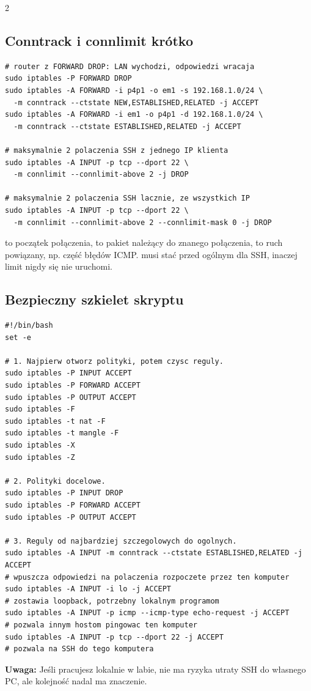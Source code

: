 \documentclass[9pt,a4paper,landscape]{article}
\newcommand{\code}[1]{\texttt{\detokenize{#1}}}
\newcommand{\warn}[1]{\textbf{Uwaga:} #1}
\begin{document}
\begin{multicols*}{2}
\subsection{Conntrack i connlimit krótko}
\begin{lstlisting}
# router z FORWARD DROP: LAN wychodzi, odpowiedzi wracaja
sudo iptables -P FORWARD DROP
sudo iptables -A FORWARD -i p4p1 -o em1 -s 192.168.1.0/24 \
  -m conntrack --ctstate NEW,ESTABLISHED,RELATED -j ACCEPT
sudo iptables -A FORWARD -i em1 -o p4p1 -d 192.168.1.0/24 \
  -m conntrack --ctstate ESTABLISHED,RELATED -j ACCEPT

# maksymalnie 2 polaczenia SSH z jednego IP klienta
sudo iptables -A INPUT -p tcp --dport 22 \
  -m connlimit --connlimit-above 2 -j DROP

# maksymalnie 2 polaczenia SSH lacznie, ze wszystkich IP
sudo iptables -A INPUT -p tcp --dport 22 \
  -m connlimit --connlimit-above 2 --connlimit-mask 0 -j DROP
\end{lstlisting}
\code{NEW} to początek połączenia, \code{ESTABLISHED} to pakiet należący do znanego połączenia, \code{RELATED} to ruch powiązany, np. część błędów ICMP. \code{connlimit} musi stać przed ogólnym \code{ACCEPT} dla SSH, inaczej limit nigdy się nie uruchomi.

\subsection{Bezpieczny szkielet skryptu}
\begin{lstlisting}
#!/bin/bash
set -e

# 1. Najpierw otworz polityki, potem czysc reguly.
sudo iptables -P INPUT ACCEPT
sudo iptables -P FORWARD ACCEPT
sudo iptables -P OUTPUT ACCEPT
sudo iptables -F
sudo iptables -t nat -F
sudo iptables -t mangle -F
sudo iptables -X
sudo iptables -Z

# 2. Polityki docelowe.
sudo iptables -P INPUT DROP
sudo iptables -P FORWARD ACCEPT
sudo iptables -P OUTPUT ACCEPT

# 3. Reguly od najbardziej szczegolowych do ogolnych.
sudo iptables -A INPUT -m conntrack --ctstate ESTABLISHED,RELATED -j ACCEPT
# wpuszcza odpowiedzi na polaczenia rozpoczete przez ten komputer
sudo iptables -A INPUT -i lo -j ACCEPT
# zostawia loopback, potrzebny lokalnym programom
sudo iptables -A INPUT -p icmp --icmp-type echo-request -j ACCEPT
# pozwala innym hostom pingowac ten komputer
sudo iptables -A INPUT -p tcp --dport 22 -j ACCEPT
# pozwala na SSH do tego komputera
\end{lstlisting}
\warn{Jeśli pracujesz lokalnie w labie, nie ma ryzyka utraty SSH do własnego PC, ale kolejność nadal ma znaczenie.}


\end{multicols*}
\end{document}
